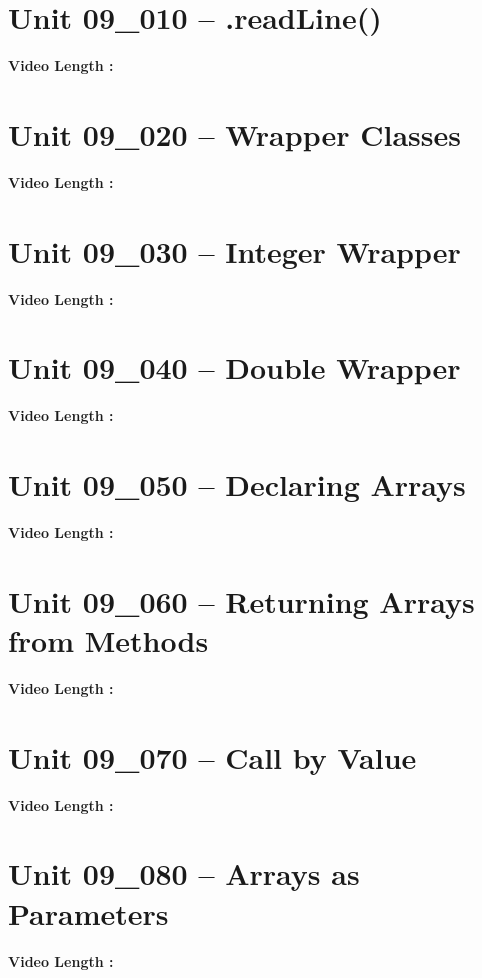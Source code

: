 \documentclass[letterpaper,12pt]{exam}
\newcommand{\unit}{Unit 09}
\begin{document}
\section*{\unit\_010 -- .readLine() } 
\par{\selectfont\textbf{Video Length :}}

\section*{\unit\_020 -- Wrapper Classes } 
\par{\selectfont\textbf{Video Length :}}

\section*{\unit\_030 -- Integer Wrapper} 
\par{\selectfont\textbf{Video Length :}}

\section*{\unit\_040 -- Double Wrapper } 
\par{\selectfont\textbf{Video Length :}}

\section*{\unit\_050 -- Declaring Arrays} 
\par{\selectfont\textbf{Video Length :}}

\section*{\unit\_060 -- Returning Arrays from Methods} 
\par{\selectfont\textbf{Video Length :}}

\section*{\unit\_070 -- Call by Value } 
\par{\selectfont\textbf{Video Length :}}

\section*{\unit\_080 -- Arrays as Parameters} 
\par{\selectfont\textbf{Video Length :}}
\end{document}
